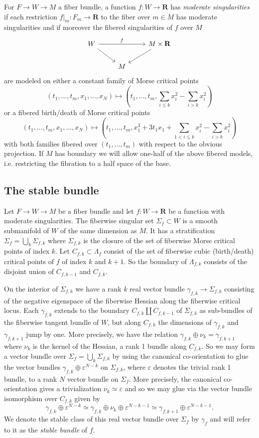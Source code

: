 \documentclass{amsart}
\newcommand{\ve}{\varepsilon}
\def\bR{\mathbf{R}}
\theoremstyle{definition}
\theoremstyle{remark}
\newtheorem{inductive lemma}[theorem]{Inductive Lemma}
\begin{document}
For $F \to W \to M$ a fiber bundle, a function $f:W \to \bR$ has {\em moderate singularities} if each restriction $f|_m:F_m \to \bR$ to the fiber over $m \in M$ has moderate singularities and if moreover the fibered singularities  of $f$ over $M$ 
\[
\begin{tikzcd}
W \arrow[dr]  \arrow[rr, "f"] &    & M \times \bR \arrow[dl] \\
& M & 
\end{tikzcd}
\]
are modeled on either a constant family of Morse critical points
$$ (t_1,\ldots,t_m,x_1,\ldots,x_N)\mapsto  (t_1,\ldots,t_m, \sum_{i\leq k}x_i^2-\sum_{i>k}x_i^2) $$
or a fibered birth/death of Morse critical points 
$$(t_1,\ldots,t_m, x_1,\ldots,x_N) \mapsto (t_1,\ldots, t_m, x_1^3+3t_1x_1 + \sum_{1<i\leq k}x_i^2 - \sum_{i >k}x_i^2 )$$
with both families fibered over $(t_1,\ldots,t_m)$ with respect to the obvious projection. If $M$ has boundary we will allow one-half of the above fibered models, i.e. restricting the fibration to a half space of the base. 

\subsection{The stable bundle}

Let $F \to W \to M$ be a fiber bundle and let $f:W \to \bR$ be a function with moderate singularities. The fiberwise singular set $\Sigma_f \subset W$ is a smooth submanifold of $W$ of the same dimension as $M$. It has a stratification $\Sigma_f = \bigcup_k \Sigma_{f,k}$ where $\Sigma_{f,k}$ is the closure of the set of fiberwise Morse critical points of index $k$. Let $C_{f,k} \subset \Lambda_f$ consist of the set of fiberwise cubic (birth/death) critical points of $f$ of index $k$ and $k+1$. So the boundary of $\Lambda_{f,k}$ consists of the disjoint union of $C_{f,k-1}$ and $C_{f,k}$. %

On the interior of $\Sigma_{f,k}$ we have a rank $k$ real vector bundle $\gamma_{f,k} \to \Sigma_{f,k}$ consisting of the negative eigenspace of the fiberwise Hessian along the fiberwise critical locus. Each $\gamma_{f,k}$ extends to the boundary $C_{f,k} \coprod C_{f,k-1}$ of $\Sigma_{f,k}$ as sub-bundles of the fiberwise tangent bundle of $W$, but along $C_{f,k}$ the dimensions of $\gamma_{f,k}$ and $\gamma_{f,k+1}$ jump by one. More precisely, we have the relation $\gamma_{f,k}\oplus \nu_k= \gamma_{f,k+1}$ where $\nu_k$ is the kernel of the Hessian, a rank 1 bundle along $C_{f,k}$. So we may form a vector bundle over $\Sigma_f=\bigcup_k \Sigma_{f,k}$ by using the canonical co-orientation to glue the vector bundles $\gamma_{f,k} \oplus \ve^{N-k}$ on $\Sigma_{f,k}$, where $\ve$ denotes the trivial rank 1 bundle, to a rank $N$ vector bundle on $\Sigma_f$. More precisely, the canonical co-orientation gives a trivialization $\nu_k \simeq \ve$ and so we may glue via the vector bundle isomorphism over $C_{f,k}$ given by
$$ \gamma_{f,k} \oplus \ve^{N-k} \simeq \gamma_{f,k} \oplus \nu_k \oplus \ve^{N-k-1} \simeq \gamma_{f,k+1} \oplus \ve^{N-k-1} .$$
We denote the stable class of this real vector bundle over $\Sigma_f$ by $\gamma_f$ and will refer to it as the {\em stable bundle} of $f$. 
\end{document}

